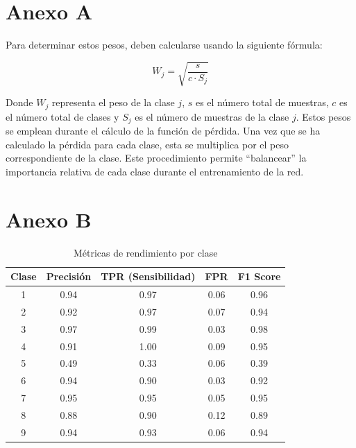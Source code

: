 \documentclass[11pt,a4paper]{book}
\begin{document}
\appendix

\chapter{Anexo A} \label{anexoa}

Para determinar estos pesos, deben calcularse usando la siguiente fórmula:

\[
W_j = \sqrt{\frac{s}{c \cdot S_j}}
\]

Donde $W_j$ representa el peso de la clase $j$, $s$ es el número total de muestras, $c$ es el número total de clases y $S_j$ es el número de muestras de la clase $j$. Estos pesos se emplean durante el cálculo de la función de pérdida. Una vez que se ha calculado la pérdida para cada clase, esta se multiplica por el peso correspondiente de la clase. Este procedimiento permite ``balancear'' la importancia relativa de cada clase durante el entrenamiento de la red.

\chapter{Anexo B} \label{anexob}

\begin{table}[H]
\centering
\begin{tabular}{|c|c|c|c|c|}
\hline
Clase & Precisión & TPR (Sensibilidad) & FPR & F1 Score \\ \hline
1 & 0.94 & 0.97 & 0.06 & 0.96 \\ \hline
2 & 0.92 & 0.97 & 0.07 & 0.94 \\ \hline
3 & 0.97 & 0.99 & 0.03 & 0.98 \\ \hline
4 & 0.91 & 1.00 & 0.09 & 0.95 \\ \hline
5 & 0.49 & 0.33 & 0.06 & 0.39 \\ \hline
6 & 0.94 & 0.90 & 0.03 & 0.92 \\ \hline
7 & 0.95 & 0.95 & 0.05 & 0.95 \\ \hline
8 & 0.88 & 0.90 & 0.12 & 0.89 \\ \hline
9 & 0.94 & 0.93 & 0.06 & 0.94 \\ \hline
\end{tabular}
\caption{Métricas de rendimiento por clase}
\label{tab:metrics}
\end{table}
\end{document}
